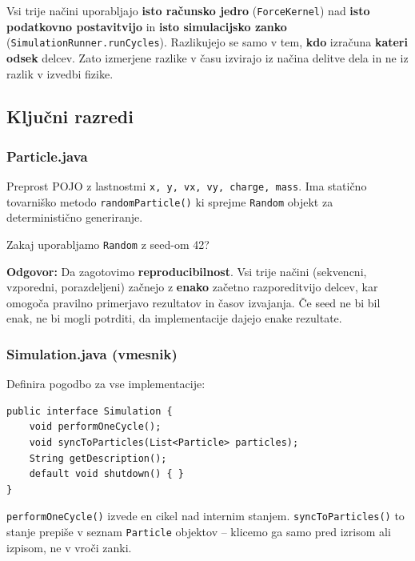 \documentclass[12pt,a4paper]{article}
\begin{document}
\begin{kljucno}
Vsi trije na\v{c}ini uporabljajo \textbf{isto ra\v{c}unsko jedro} (\texttt{ForceKernel}) nad \textbf{isto podatkovno postavitvijo} in \textbf{isto simulacijsko zanko} (\texttt{SimulationRunner.runCycles}). Razlikujejo se samo v tem, \textbf{kdo} izra\v{c}una \textbf{kateri odsek} delcev. Zato izmerjene razlike v \v{c}asu izvirajo iz na\v{c}ina delitve dela in ne iz razlik v izvedbi fizike.
\end{kljucno}

\subsection{Klju\v{c}ni razredi}

\subsubsection{Particle.java}
Preprost POJO z lastnostmi \texttt{x, y, vx, vy, charge, mass}. Ima stati\v{c}no tovarni\v{s}ko metodo \texttt{randomParticle()} ki sprejme \texttt{Random} objekt za deterministi\v{c}no generiranje.

\begin{vprasanje}
Zakaj uporabljamo \texttt{Random} z seed-om 42?

\textbf{Odgovor:} Da zagotovimo \textbf{reproducibilnost}. Vsi trije na\v{c}ini (sekvencni, vzporedni, porazdeljeni) za\v{c}nejo z \textbf{enako} za\v{c}etno razporeditvijo delcev, kar omogo\v{c}a pravilno primerjavo rezultatov in \v{c}asov izvajanja. \v{C}e seed ne bi bil enak, ne bi mogli potrditi, da implementacije dajejo enake rezultate.
\end{vprasanje}

\subsubsection{Simulation.java (vmesnik)}
Definira pogodbo za vse implementacije:
\begin{lstlisting}
public interface Simulation {
    void performOneCycle();
    void syncToParticles(List<Particle> particles);
    String getDescription();
    default void shutdown() { }
}
\end{lstlisting}

\texttt{performOneCycle()} izvede en cikel nad internim stanjem. \texttt{syncToParticles()} to stanje prepi\v{s}e v seznam \texttt{Particle} objektov -- klicemo ga samo pred izrisom ali izpisom, ne v vro\v{c}i zanki.
\end{document}
